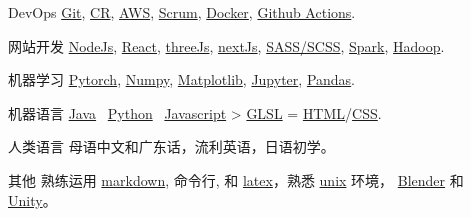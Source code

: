 
\begin{cvskills}

  \cvskill
    {DevOps} %
    {\href{https://git-scm.com/}{Git}, \href{https://en.wikipedia.org/wiki/Code_review}{CR}, \href{https://aws.amazon.com/}{AWS}, \href{https://www.scrum.org/resources/what-is-scrum}{Scrum}, \href{https://www.docker.com/}{Docker}, \href{https://github.com/features/actions}{Github Actions}.}

  \cvskill
    {网站开发} %
    {\href{https://nodejs.org/en/}{NodeJs}, \href{https://reactjs.org/}{React}, \href{https://threejs.org/}{threeJs}, \href{https://nextjs.org/}{nextJs}, \href{https://sass-lang.com/}{SASS/SCSS}, \href{https://spark.apache.org/}{Spark}, \href{https://hadoop.apache.org/}{Hadoop}.}

  \cvskill
    {机器学习} %
    {\href{https://pytorch.org/}{Pytorch}, \href{https://numpy.org/}{Numpy}, \href{https://matplotlib.org/}{Matplotlib}, \href{https://jupyter.org/}{Jupyter}, \href{https://pandas.pydata.org/}{Pandas}.}  %

  \cvskill
    {机器语言}
    {\href{https://www.java.com/en/}{Java} \approx\, \href{https://www.python.org/}{Python} \approx\, \href{https://www.javascript.com/}{Javascript} > \href{https://www.khronos.org/opengl/wiki/OpenGL_Shading_Language}{GLSL} = \href{https://developer.mozilla.org/en-US/docs/Glossary/HTML5}{HTML}/\href{https://developer.mozilla.org/en-US/docs/Web/CSS}{CSS}.}

  \cvskill
    {人类语言}
    {母语中文和广东话，流利英语，日语初学。}

  \cvskill
    {其他} %
    {熟练运用 \href{https://en.wikipedia.org/wiki/Markdown}{markdown}, 命令行, 和 \href{https://www.latex-project.org/}{latex}，熟悉 \href{https://en.wikipedia.org/wiki/Unix}{unix} 环境， \href{https://www.blender.org/}{Blender} 和 \href{https://unity.com/}{Unity}。}

\end{cvskills}
